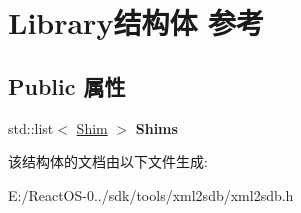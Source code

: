 \hypertarget{struct_library}{}\section{Library结构体 参考}
\label{struct_library}
\subsection*{Public 属性}
\begin{DoxyCompactItemize}
\item 
\mbox{\label{struct_library_a05141e72fb303a6aaa8abd0b4f4b3fac}} 
std\+::list$<$ \hyperlink{struct_shim}{Shim} $>$ {\bfseries Shims}
\end{DoxyCompactItemize}


该结构体的文档由以下文件生成\+:\begin{DoxyCompactItemize}
\item 
E\+:/\+React\+O\+S-\/0../sdk/tools/xml2sdb/xml2sdb.\+h\end{DoxyCompactItemize}
